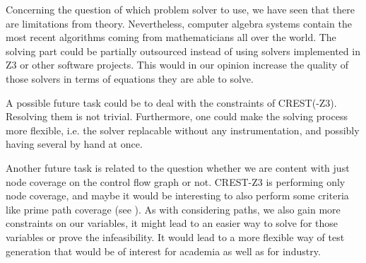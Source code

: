 \documentclass[oribibl]{llncs}
\begin{document}
Concerning the question of which problem solver to use, we have seen that there are limitations from theory. Nevertheless, computer algebra systems contain the most recent algorithms coming from mathematicians all over the world. The solving part could be partially outsourced instead of using solvers implemented in \textsc{Z3} or other software projects. This would in our opinion increase the quality of those solvers in terms of equations they are able to solve.

A possible future task could be to deal with the constraints of \textsc{CREST(-Z3)}. Resolving them is not trivial. Furthermore, one could make the solving process more flexible, i.e. the solver replacable without any instrumentation, and possibly having several by hand at once.

Another future task is related to the question whether we are content with just node coverage on the control flow graph or not. \textsc{CREST-Z3} is performing only node coverage, and maybe it would be interesting to also perform some criteria like prime path coverage (see \cite{ammann2008introduction}). As with considering paths, we also gain more constraints on our variables, it might lead to an easier way to solve for those variables or prove the infeasibility. It would lead to a more flexible way of test generation that would be of interest for academia as well as for industry.





\end{document}
